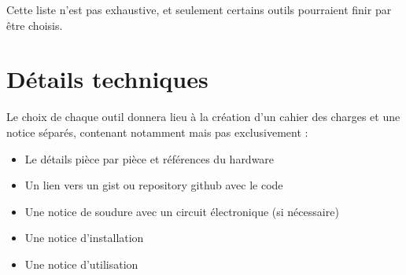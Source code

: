 \documentclass[12pt]{article}
\begin{document}
    \noindent Cette liste n’est pas exhaustive, et seulement certains outils pourraient finir par être choisis.

    \section{Détails techniques}

    Le choix de chaque outil donnera lieu à la création d’un cahier des charges et une notice séparés, contenant notamment mais pas exclusivement :

    \begin{itemize}
        \item{Le détails pièce par pièce et références du hardware}
        \item{Un lien vers un gist ou repository github avec le code}
        \item{Une notice de soudure avec un circuit électronique (si nécessaire)}
        \item{Une notice d’installation}
        \item{Une notice d’utilisation}
    \end{itemize}
\end{document}
